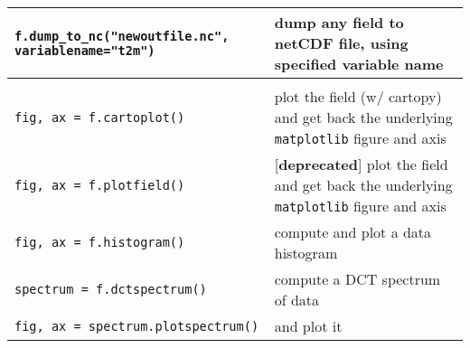 \documentclass[a4paper,10pt]{article}
\begin{document}
\begin{tabular}{|p{9.5cm}|p{9.5cm}|}
\texttt{f.dump\_to\_nc("newoutfile.nc", variablename="t2m")} & dump any field to netCDF file, using specified variable name\\
\hline
\rowcolor{gray!50}
\multicolumn{2}{|c|}{\textbf{Fields data representation}}\\
\hline
\texttt{fig, ax = f.cartoplot()} & plot the field (w/ cartopy) and get back the underlying \texttt{matplotlib} figure and axis\\
\texttt{fig, ax = f.plotfield()} & [\textbf{deprecated}] plot the field and get back the underlying \texttt{matplotlib} figure and axis\\
\texttt{fig, ax = f.histogram()} & compute and plot a data histogram\\
\texttt{spectrum = f.dctspectrum()} & compute a DCT spectrum of data\\
\texttt{fig, ax = spectrum.plotspectrum()} & and plot it\\
\hline
\end{tabular}\\
\\
\end{document}
